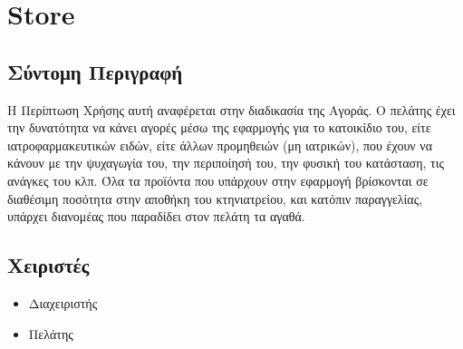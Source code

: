 \documentclass[12pt,a4paper,twoside]{book}
\begin{document}


\section{Store} %

\subsection{Σύντομη Περιγραφή}
Η Περίπτωση Χρήσης αυτή αναφέρεται στην διαδικασία της Αγοράς. Ο πελάτης έχει την δυνατότητα να κάνει αγορές μέσω της εφαρμογής για το κατοικίδιο του, είτε ιατροφαρμακευτικών ειδών, είτε άλλων προμηθειών (μη ιατρικών), που έχουν να κάνουν με την ψυχαγωγία του, την περιποίησή του, την φυσική του κατάσταση, τις ανάγκες του κλπ.  Όλα τα προϊόντα που υπάρχουν στην εφαρμογή βρίσκονται σε διαθέσιμη ποσότητα στην αποθήκη του κτηνιατρείου, και κατόπιν παραγγελίας, υπάρχει διανομέας που παραδίδει στον πελάτη τα αγαθά. %

\subsection{Χειριστές}
\begin{itemize}
  \item Διαχειριστής
  \item Πελάτης
\end{itemize}
\end{document}
